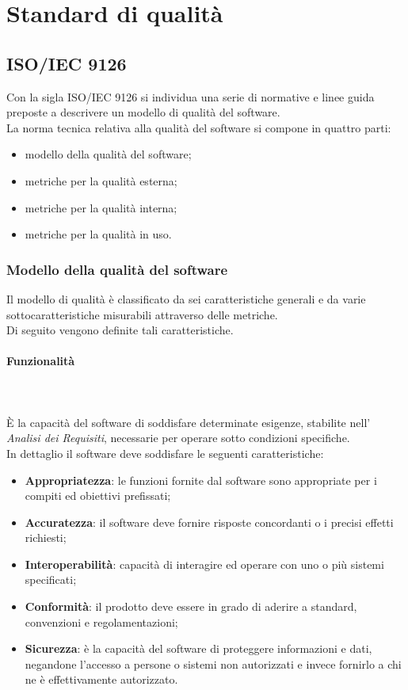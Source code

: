 \section{Standard di qualità}

\subsection{ISO/IEC 9126}
Con la sigla ISO/IEC 9126 si individua una serie di normative e linee guida preposte a descrivere un modello di qualità del software. \\
La norma tecnica relativa alla qualità del software si compone in quattro parti:
\begin{itemize}
	\item modello della qualità del software;
	\item metriche per la qualità esterna;
	\item metriche per la qualità interna;
	\item metriche per la qualità in uso.
\end{itemize}
\subsubsection{Modello della qualità del software}
Il modello di qualità è classificato da sei caratteristiche generali e da varie sottocaratteristiche misurabili attraverso delle metriche.\\
Di seguito vengono definite tali caratteristiche.

\paragraph{Funzionalità} \mbox{} \\ \mbox{} \\
È la capacità del software di soddisfare determinate esigenze, stabilite nell' \textit{Analisi dei Requisiti}, necessarie per operare sotto condizioni specifiche. \\
In dettaglio il software deve soddisfare le seguenti caratteristiche:
\begin{itemize}
	\item \textbf{Appropriatezza}: le funzioni fornite dal software sono appropriate per i compiti ed obiettivi prefissati;
	\item \textbf{Accuratezza}: il software deve fornire risposte concordanti o i precisi effetti richiesti;
	\item \textbf{Interoperabilità}: capacità di interagire ed operare con uno o più sistemi specificati;
	\item \textbf{Conformità}: il prodotto deve essere in grado di aderire a standard, convenzioni e regolamentazioni;
	\item \textbf{Sicurezza}: è la capacità del software di proteggere informazioni e dati, negandone l'accesso a persone o sistemi non autorizzati e invece fornirlo a chi ne è effettivamente autorizzato.
\end{itemize}
